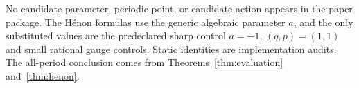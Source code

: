 \documentclass[11pt]{article}
\theoremstyle{definition}
\theoremstyle{remark}
\begin{document}
No candidate parameter, periodic point, or candidate action appears in the
paper package.  The H\'enon formulas use the generic algebraic parameter
$a$, and the only substituted values are the predeclared sharp control
$a=-1$, $(q,p)=(1,1)$ and small rational gauge controls.  Static identities
are implementation audits.  The all-period conclusion comes from
Theorems~\ref{thm:evaluation} and~\ref{thm:henon}.
\end{document}
